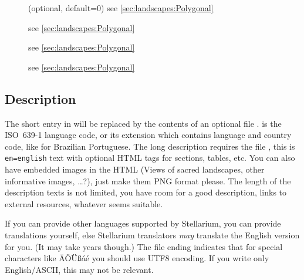 \begin{description}
%
\item[] (optional, default=0) see \ref{sec:landscapes:Polygonal} %
\item[] see \ref{sec:landscapes:Polygonal} %
\item[]  see \ref{sec:landscapes:Polygonal} %
\item[] see \ref{sec:landscapes:Polygonal} %
\end{description}


\subsection{Description}
\label{sec:landscapes:Description}

The short  entry in  will be
replaced by the contents of an optional file
.  is the ISO~639-1
language code, or its extension which contains language and country
code, like  for Brazilian Portuguese. The long
description requires the file , this is
\texttt{en=english} text with optional HTML tags for sections, tables,
etc. You can also have embedded images in the HTML (Views of sacred
landscapes, other informative images, \ldots?), just make them PNG
format please. The length of the description texts is not limited, you
have room for a good description, links to external resources,
whatever seems suitable.

If you can provide other languages supported by Stellarium, you can
provide translations yourself, else Stellarium translators \emph{may}
translate the English version for you. (It may take years though.) The file
ending  indicates that for special characters like ÄÖÜßáé
you should use UTF8 encoding. If you write only English/ASCII, this may not
be relevant.




